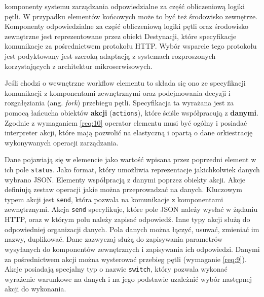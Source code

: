komponenty systemu zarządzania odpowiedzialne za część obliczeniową logiki pętli. W przypadku elementów końcowych może to być też środowisko zewnętrze. Komponenty odpowiedzialne za część obliczeniową logiki pętli oraz środowisko zewnętrzne jest reprezentowane przez obiekt Destynacji, które specyfikacje komunikacje za pośrednictwem protokołu HTTP. Wybór wsparcie tego protokołu jest podyktowany jest szeroką adaptacją z systemach rozproszonych korzystających z architektur mikroserwisowych.

Jeśli chodzi o wewnętrzne workflow elementu to składa się ono ze specyfikacji komunikacji z komponentami zewnętrznymi oraz podejmowania decyzji i rozgałęziania (ang. \textit{fork}) przebiegu pętli. Specyfikacja ta wyrażana jest za pomocą łańcucha obiektów \textbf{akcji} (\texttt{actions}), które ściśle współpracują z \textbf{danymi}. Zgodnie z wymaganiem \ref{req:10} operator elementu musi być ogólny i posiadać interpreter akcji, które mają pozwolić na elastyczną i opartą o dane orkiestrację wykonywanych operacji zarządzania. 

Dane pojawiają się w elemencie jako wartość wpisana przez poprzedni element w ich pole \texttt{status}. Jako format, który umożliwia reprezentacje jakichkolwiek danych wybrano JSON. Elementy współpracją z danymi poprzez obiekty akcji. Akcje definiują zestaw operacji jakie można przeprowadzać na danych. Kluczowym typem akcji jest \texttt{send}, która pozwala na komunikacje z komponentami zewnętrznymi. Akcja \texttt{send} specyfikuje, które pole JSON należy wysłać w żądaniu HTTP, oraz w którym polu należy zapisać odpowiedź. Inne typy akcji służą do odpowiedniej organizacji danych. Pola danych można łączyć, usuwać, zmieniać im nazwy, duplikować. Dane zazwyczaj służą do zapisywania parametrów wysyłanych do komponentów zewnętrznych i zapisywania ich odpowiedzi. Danymi za pośrednictwem akcji można wysterować przebieg pętli (wymaganie \ref{req:9}). Akcje posiadają specjalny typ o nazwie \texttt{switch}, który pozwala wykonać wyrażenie warunkowe na danych i na jego podstawie uzależnić wybór następnej akcji do wykonania.